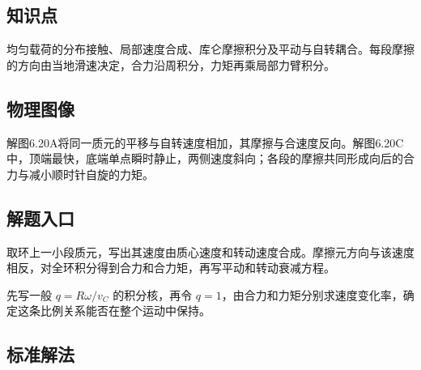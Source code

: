 \documentclass[UTF8,fontset=fandol,a4paper,11pt]{ctexart}
\begin{document}


\subsection*{知识点}

均匀载荷的分布接触、局部速度合成、库仑摩擦积分及平动与自转耦合。每段摩擦的方向由当地滑速决定，合力沿周积分，力矩再乘局部力臂积分。




\subsection*{物理图像}

解图6.20A将同一质元的平移与自转速度相加，其摩擦与合速度反向。解图6.20C中，顶端最快，底端单点瞬时静止，两侧速度斜向；各段的摩擦共同形成向后的合力与减小顺时针自旋的力矩。



\subsection*{解题入口}

取环上一小段质元，写出其速度由质心速度和转动速度合成。摩擦元方向与该速度相反，对全环积分得到合力和合力矩，再写平动和转动衰减方程。

先写一般 $q=R\omega/v_C$ 的积分核，再令 $q=1$，由合力和力矩分别求速度变化率，确定这条比例关系能否在整个运动中保持。



\subsection*{标准解法}
\end{document}
